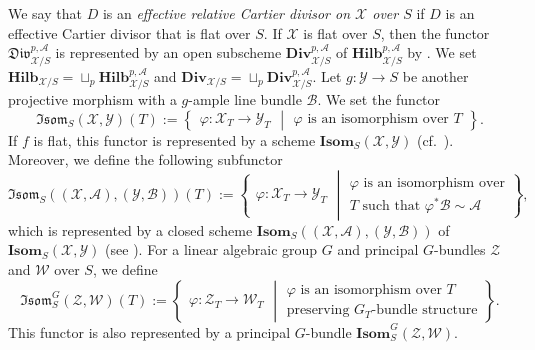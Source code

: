\documentclass[12pt,twoside]{amsart}
\theoremstyle{definition}
\begin{document}
We say that $D$ is an {\em effective relative Cartier divisor on $\mathscr{X}$ over $S$} if $D$ is an effective Cartier divisor that is flat over $S$. 
If $\mathscr{X}$ is flat over $S$, then the functor $\mathfrak{Div}^{p,\mathscr{A}}_{\mathscr{X}/S}$ is represented by an open subscheme $\mathbf{Div}^{p,\mathscr{A}}_{\mathscr{X}/S}$ of $\mathbf{Hilb}^{p,\mathscr{A}}_{\mathscr{X}/S}$ by \cite[Theorem 9.3.7]{FGA}.
We set $\mathbf{Hilb}_{\mathscr{X}/S}=\sqcup_{p}\mathbf{Hilb}^{p,\mathscr{A}}_{\mathscr{X}/S}$ and $\mathbf{Div}_{\mathscr{X}/S}=\sqcup_{p}\mathbf{Div}^{p,\mathscr{A}}_{\mathscr{X}/S}$.
Let $g\colon\mathscr{Y}\to S$ be another projective morphism with a $g$-ample line bundle $\mathscr{B}$.
We set the functor
\[
\mathfrak{Isom}_S(\mathscr{X},\mathscr{Y})(T):=\left\{
\begin{array}{l}
\varphi\colon \mathscr{X}_T\to\mathscr{Y}_T
\end{array}
\middle|
\begin{array}{l}
\text{$\varphi$ is an isomorphism over $T$}
\end{array}\right\}.
\]
If $f$ is flat, this functor is represented by a scheme $\mathbf{Isom}_S(\mathscr{X},\mathscr{Y})$ (cf.~\cite[Theorem 5.23]{FGA}).
Moreover, we define the following subfunctor
\[
\mathfrak{Isom}_S((\mathscr{X},\mathscr{A}),(\mathscr{Y},\mathscr{B}))(T):=\left\{
\begin{array}{l}
\varphi\colon \mathscr{X}_T\to\mathscr{Y}_T
\end{array}
\middle|
\begin{array}{l}
\text{$\varphi$ is an isomorphism over}\\
\text{$T$ such that $\varphi^*\mathscr{B}\sim\mathscr{A}$}
\end{array}\right\},
\]
which is represented by a closed scheme $\mathbf{Isom}_S((\mathscr{X},\mathscr{A}),(\mathscr{Y},\mathscr{B}))$ of $\mathbf{Isom}_S(\mathscr{X},\mathscr{Y})$ (see \cite[\S2.2]{HH}).
For a linear algebraic group $G$ and principal $G$-bundles $\mathscr{Z}$ and $\mathscr{W}$ over $S$, we define
\[
\mathfrak{Isom}_S^G(\mathscr{Z},\mathscr{W})(T):=\left\{
\begin{array}{l}
\varphi\colon \mathscr{Z}_T\to\mathscr{W}_T
\end{array}
\middle|
\begin{array}{l}
\text{$\varphi$ is an isomorphism over $T$}\\
\text{preserving $G_T$-bundle structure}
\end{array}\right\}.
\]
This functor is also represented by a principal $G$-bundle $\mathbf{Isom}^G_S(\mathscr{Z},\mathscr{W})$. 
\end{document}
